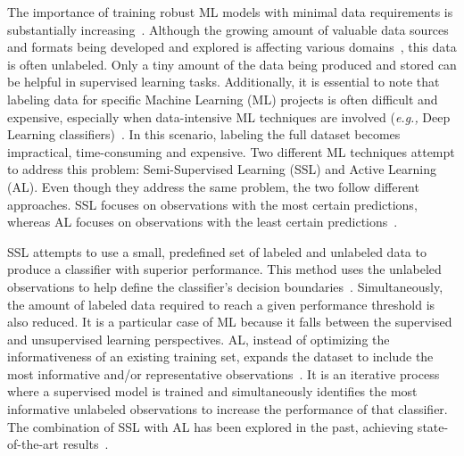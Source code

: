 The importance of training robust ML models with minimal data requirements is
substantially increasing~\cite{Nath2021, Sverchkov2017, Li2012}. Although the
growing amount of valuable data sources and formats being developed and
explored is affecting various domains~\cite{Li2021}, this data is often
unlabeled. Only a tiny amount of the data being produced and stored can be
helpful in supervised learning tasks. Additionally, it is essential to
note that labeling data for specific Machine Learning (ML) projects is often
difficult and expensive, especially when data-intensive ML techniques are
involved (\textit{e.g.,} Deep Learning classifiers)~\cite{Nath2021}. In this
scenario, labeling the full dataset becomes impractical, time-consuming
and expensive. Two different ML techniques attempt to address this
problem: Semi-Supervised Learning (SSL) and Active Learning (AL). Even though
they address the same problem, the two follow different approaches. SSL
focuses on observations with the most certain predictions, whereas AL focuses
on observations with the least certain predictions~\cite{Simeoni2020}.

SSL attempts to use a small, predefined set of labeled and unlabeled data to
produce a classifier with superior performance. This method uses the unlabeled
observations to help define the classifier's decision
boundaries~\cite{Van2020}. Simultaneously, the amount of labeled data required
to reach a given performance threshold is also reduced. It is a
particular case of ML because it falls between the supervised and
unsupervised learning perspectives. AL, instead of optimizing the
informativeness of an existing training set, expands the dataset
to include the most informative and/or representative
observations~\cite{Sener2018}. It is an iterative process where a 
supervised model is trained and simultaneously identifies the
most informative unlabeled observations to increase the performance of
that classifier. The combination of SSL with AL has been explored in the past,
achieving state-of-the-art results~\cite{Leng2013}.
 
